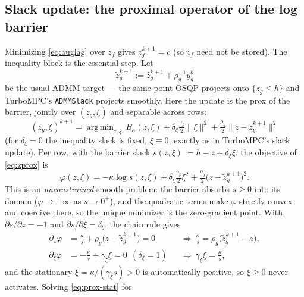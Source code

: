 \documentclass[10pt,twocolumn]{article}
\DeclareMathOperator*{\argmin}{arg\,min}
\begin{document}
\subsection{Slack update: the proximal operator of the log barrier}
\label{sec:slackupdate}
Minimizing \eqref{eq:auglag} over $z_f$ gives $z_f^{k+1} = c$ (so $z_f$ need not be
stored). The inequality block is the essential step. Let
\begin{equation}
\label{eq:ztilde}
\tilde z_g^{k+1} := \hat z_g^{k+1} + \rho_g^{-1}y_g^{k}
\end{equation}
be the usual ADMM target --- the same point OSQP projects onto $\{z_g\le h\}$ and
TurboMPC's \texttt{ADMMSlack} projects smoothly. Here the update is the prox of the
barrier, jointly over $(z_g,\xi)$ and separable across rows:
\begin{equation}
\label{eq:zprox}
(z_g,\xi)^{k+1}
= \argmin_{z,\xi}\, B_\kappa(z,\xi)
+ \delta_\xi\tfrac{\gamma_\xi}{2}\|\xi\|^2
+ \tfrac{\rho_g}{2}\|z - \tilde z_g^{k+1}\|^2
\end{equation}
(for $\delta_\xi = 0$ the inequality slack is fixed, $\xi \equiv 0$, exactly as in
TurboMPC's slack update). Per row, with the barrier slack
$s(z,\xi) := h - z + \delta_\xi\xi$, the objective of \eqref{eq:zprox} is
\begin{equation}
\label{eq:prox-obj}
\varphi(z,\xi) = -\kappa\log s(z,\xi)
+ \delta_\xi\tfrac{\gamma_\xi}{2}\xi^2
+ \tfrac{\rho_g}{2}\bigl(z - \tilde z_g^{k+1}\bigr)^2 .
\end{equation}
This is an \emph{unconstrained} smooth problem: the barrier absorbs $s \ge 0$ into
its domain ($\varphi\to+\infty$ as $s\to 0^+$), and the quadratic terms make
$\varphi$ strictly convex and coercive there, so the unique minimizer is the
zero-gradient point. With $\partial s/\partial z = -1$ and
$\partial s/\partial\xi = \delta_\xi$, the chain rule gives
\begin{equation}
\label{eq:prox-stat}
\begin{aligned}
\partial_z\varphi
&= \tfrac{\kappa}{s} + \rho_g\bigl(z - \tilde z_g^{k+1}\bigr) = 0
&&\Rightarrow\
\tfrac{\kappa}{s} = \rho_g\bigl(\tilde z_g^{k+1} - z\bigr),\\
\partial_\xi\varphi
&= -\tfrac{\kappa}{s} + \gamma_\xi\xi = 0\ \ (\delta_\xi{=}1)
&&\Rightarrow\
\gamma_\xi\xi = \tfrac{\kappa}{s},
\end{aligned}
\end{equation}
and the stationary $\xi = \kappa/(\gamma_\xi s) > 0$ is automatically positive, so
$\xi \ge 0$ never activates. Solving \eqref{eq:prox-stat} for
\end{document}
